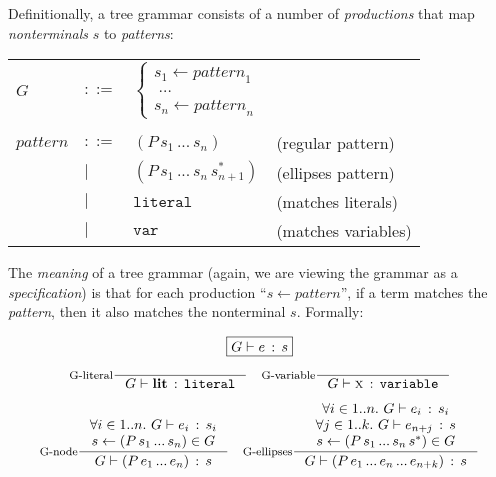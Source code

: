 \documentclass[
  11pt,
  paper=letter,
  footinclude=true,
  headinclude=true,
  american
]{scrbook}
\makeatletter
\newenvironment{jtable}
{\begin{center}\begin{tabular}{l l l @{\quad}l}}
{\end{tabular}\end{center}}
\newcommand{\ddd}{\;\dots\;}
\newcommand{\dd}{\,...\,}
\newcommand{\Forall}[1]{\forall{#1}.\,\,}
\newcommand{\name}[1]{\textit{#1}}
\newcommand{\constName}[1]{\texttt{#1}}
\newcommand{\lit}[1]{\textbf{#1}}
\newcommand{\expr}[2]{(#1\,#2)}
\newcommand{\var}[1]{\textrm{\textsc{#1}}}
\newcommand{\exprs}[3]{(#1\,#2\,#3^{*})}
\newcommand{\production}[2]{#1 \leftarrow #2}
\newcommand{\saysG}[3]{#1 \vdash #2\,:\,#3}
\makeatother
\begin{document}
Definitionally, a tree grammar consists of a number of
\emph{productions} that map \emph{nonterminals} $s$ to
\name{patterns}:
\begin{jtable}
  $G$
  &$::=$& $\left\{ \begin{array}{l}
    \production{s_1}{\name{pattern}_1} \\
    \ddd \\
    \production{s_n}{\name{pattern}_n}
    \end{array}\right.$ \\
  \\
  $\name{pattern}$
  &$::=$& $\expr{P}{s_1 \dd s_n}$ &(regular pattern) \\
  &$|$&
  $\exprs{P}{s_1 \dd s_n}{s_{n+1}}$
  &(ellipses pattern) \\
  &$|$&   $\constName{literal}$ &(matches literals) \\
  &$|$&   $\constName{var}$ &(matches variables)
\end{jtable}

The \emph{meaning} of a tree grammar (again, we are viewing the
grammar as a \emph{specification}) is that for each production
``$\production{s}{\name{pattern}}$'', if a term matches the
\name{pattern}, then it also matches the nonterminal $s$. Formally:

\[
\fbox{$\saysG{G}{e}{s}$}
\]

\[
\inference
    [G-literal]
    {}
    {\saysG{G}{\lit{lit}}{\constName{literal}}}
\quad
\inference
    [G-variable]
    {}
    {\saysG{G}{\var{x}}{\constName{variable}}}
\]
    
\[
\inference
    [G-node]
    {\Forall{i \in 1..n} \saysG{G}{e_i}{s_i} \\
      \production{s}{\expr{P}{s_1 \dd s_n}} \in G}
    {\saysG{G}{\expr{P}{e_1 \dd e_n}}{s}}
\quad
\inference
    [G-ellipses]
    {\Forall{i \in 1..n} \saysG{G}{e_i}{s_i} \\
      \Forall{j \in 1..k} \saysG{G}{e_{n+j}}{s} \\
      \production{s}{\exprs{P}{s_1 \dd s_n}{s}} \in G}
    {\saysG{G}{\expr{P}{e_1 \dd e_n \dd e_{n+k}}}{s}}
\]
\end{document}

